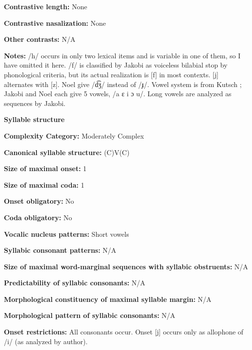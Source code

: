 \textbf{Contrastive length:} None



\textbf{Contrastive nasalization:} None



\textbf{Other contrasts:} N/A



\textbf{Notes:} /h/ occurs in only two lexical items and is variable in one of them, so I have omitted it here. /f/ is classified by Jakobi as voiceless bilabial stop by phonological criteria, but its actual realization is [f] in most contexts. [j] alternates with [z]. Noel give /d͡ʒ/ instead of /ɟ/. Vowel system is from Kutsch \citet{LojengaWaag2004}; Jakobi and Noel each give 5 vowels, /a ɛ i ɔ u/. Long vowels are analyzed as sequences by Jakobi.



\textbf{Syllable structure}



\textbf{Complexity Category:} Moderately Complex



\textbf{Canonical syllable structure:} (C)V(C) \citep[53-8]{Jakobi1990}



\textbf{Size of maximal onset:} 1



\textbf{Size of maximal coda:} 1



\textbf{Onset obligatory:} No



\textbf{Coda obligatory:} No



\textbf{Vocalic nucleus patterns:} Short vowels



\textbf{Syllabic consonant patterns:} N/A



\textbf{Size of maximal word{}-marginal sequences with syllabic obstruents:} N/A



\textbf{Predictability of syllabic consonants:} N/A



\textbf{Morphological constituency of maximal syllable margin:} N/A



\textbf{Morphological pattern of syllabic consonants:} N/A



\textbf{Onset restrictions:} All consonants occur. Onset [j] occurs only as allophone of /i/ (as analyzed by author).



